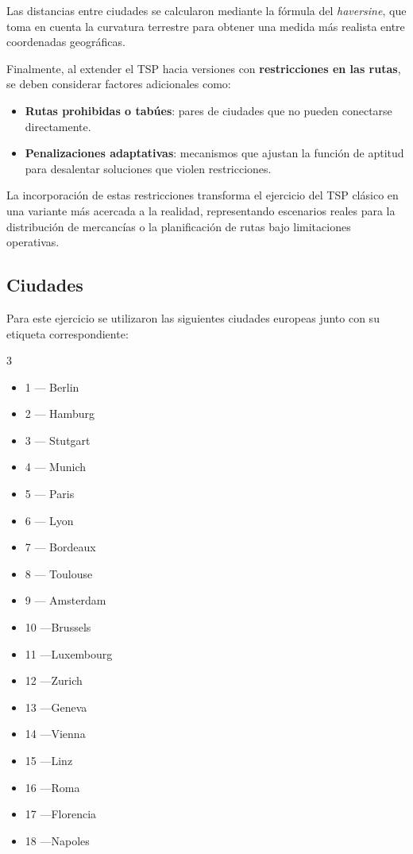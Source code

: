 Las distancias entre ciudades se calcularon mediante la fórmula del \textit{haversine}, que toma en cuenta la curvatura terrestre para obtener una medida más realista entre coordenadas geográficas.

Finalmente, al extender el TSP hacia versiones con \textbf{restricciones en las rutas}, se deben considerar factores adicionales como:
\begin{itemize}
    \item \textbf{Rutas prohibidas o tabúes}: pares de ciudades que no pueden conectarse directamente.
    \item \textbf{Penalizaciones adaptativas}: mecanismos que ajustan la función de aptitud para desalentar soluciones que violen restricciones.
\end{itemize}

La incorporación de estas restricciones transforma el ejercicio del TSP clásico en una variante más acercada a la realidad, representando escenarios reales para la distribución de mercancías o la planificación de rutas bajo limitaciones operativas.

\subsection{Ciudades}\label{lista_ciudades}
Para este ejercicio se utilizaron las siguientes ciudades europeas junto con su etiqueta correspondiente:
\begin{multicols}{3}
    \begin{itemize}
        \item 1 --- Berlin
        \item 2 --- Hamburg
        \item 3 --- Stutgart
        \item 4 --- Munich
        \item 5 --- Paris
        \item 6 --- Lyon
        \item 7 --- Bordeaux
        \item 8 --- Toulouse
        \item 9 --- Amsterdam
        \item 10 ---Brussels
        \item 11 ---Luxembourg
        \item 12 ---Zurich
        \item 13 ---Geneva
        \item 14 ---Vienna
        \item 15 ---Linz
        \item 16 ---Roma
        \item 17 ---Florencia
        \item 18 ---Napoles
    \end{itemize}
\end{multicols}

